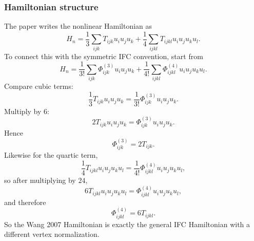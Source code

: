 \subsubsection{Hamiltonian structure}
The paper writes the nonlinear Hamiltonian as
\begin{equation}
    H_n = \frac{1}{3}\sum_{ijk}T_{ijk}u_i u_j u_k + \frac{1}{4}\sum_{ijkl}T_{ijkl}u_i u_j u_k u_l.
    \label{eq:wang2007_Hn_repeated_again}
\end{equation}
To connect this with the symmetric IFC convention, start from
\begin{equation}
    H_n = \frac{1}{3!}\sum_{ijk}\Phi^{(3)}_{ijk}u_i u_j u_k + \frac{1}{4!}\sum_{ijkl}\Phi^{(4)}_{ijkl}u_i u_j u_k u_l.
    \label{eq:symmetric_Hn_for_wang2007_recovery}
\end{equation}
Compare cubic terms:
\begin{equation}
    \frac{1}{3}T_{ijk}u_i u_j u_k = \frac{1}{3!}\Phi^{(3)}_{ijk}u_i u_j u_k.
\end{equation}
Multiply by $6$:
\begin{equation}
    2T_{ijk}u_i u_j u_k = \Phi^{(3)}_{ijk}u_i u_j u_k.
\end{equation}
Hence
\begin{equation}
    \Phi^{(3)}_{ijk} = 2T_{ijk}.
    \label{eq:wang2007_phi3_conversion}
\end{equation}
Likewise for the quartic term,
\begin{equation}
    \frac{1}{4}T_{ijkl}u_i u_j u_k u_l = \frac{1}{4!}\Phi^{(4)}_{ijkl}u_i u_j u_k u_l,
\end{equation}
so after multiplying by $24$,
\begin{equation}
    6T_{ijkl}u_i u_j u_k u_l = \Phi^{(4)}_{ijkl}u_i u_j u_k u_l,
\end{equation}
and therefore
\begin{equation}
    \Phi^{(4)}_{ijkl} = 6T_{ijkl}.
    \label{eq:wang2007_phi4_conversion}
\end{equation}
So the Wang 2007 Hamiltonian is exactly the general IFC Hamiltonian with a different vertex normalization.

